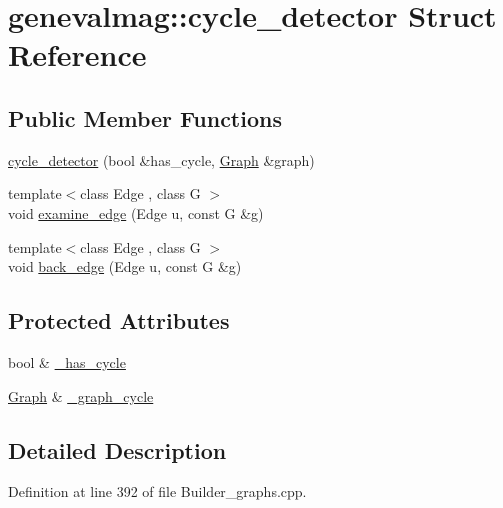 \hypertarget{structgenevalmag_1_1cycle__detector}{
\section{genevalmag::cycle\_\-detector Struct Reference}
\label{structgenevalmag_1_1cycle__detector}
}
\subsection*{Public Member Functions}
\begin{CompactItemize}
\item 
\hyperlink{structgenevalmag_1_1cycle__detector_d33c61b557029f98461f984f43a25e2d}{cycle\_\-detector} (bool \&has\_\-cycle, \hyperlink{namespacegenevalmag_4a96de9ebfc7d48233406ab9cad55cb5}{Graph} \&graph)
\item 
{\footnotesize template$<$class Edge , class G $>$ }\\void \hyperlink{structgenevalmag_1_1cycle__detector_44fccd4a457ae19a0b9fb61cad4f40a7}{examine\_\-edge} (Edge u, const G \&g)
\item 
{\footnotesize template$<$class Edge , class G $>$ }\\void \hyperlink{structgenevalmag_1_1cycle__detector_9c656f2de80c65c02f061bc75268ea32}{back\_\-edge} (Edge u, const G \&g)
\end{CompactItemize}
\subsection*{Protected Attributes}
\begin{CompactItemize}
\item 
bool \& \hyperlink{structgenevalmag_1_1cycle__detector_fbb82ee351ec3962b57fcf2b0d21b3b4}{\_\-has\_\-cycle}
\item 
\hyperlink{namespacegenevalmag_4a96de9ebfc7d48233406ab9cad55cb5}{Graph} \& \hyperlink{structgenevalmag_1_1cycle__detector_7ea4fce7ca4725c4734493281f3742b0}{\_\-graph\_\-cycle}
\end{CompactItemize}


\subsection{Detailed Description}


Definition at line 392 of file Builder\_\-graphs.cpp.

